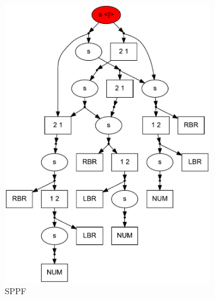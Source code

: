 \begin{figure}[ht]
    \begin{center}
    \centering
    \begin{subfigure}[b]{0.3\textwidth}
        \includegraphics[width=\textwidth]{dot/Brackets.pdf}
        \caption{SPPF}
        \label{sppf}        
    \end{subfigure}
    ~
    \begin{subfigure}[b]{0.3\textwidth}

\end{subfigure}
\end{center}
\end{figure}
